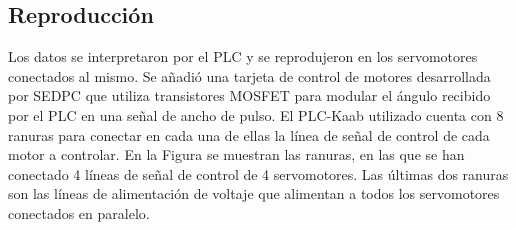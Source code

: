\subsection{Reproducción}

Los datos se interpretaron por el PLC y se reprodujeron en los servomotores conectados al mismo. Se añadió una tarjeta de control de motores desarrollada por SEDPC que utiliza transistores MOSFET para modular el ángulo recibido por el PLC en una señal de ancho de pulso. El PLC-Kaab utilizado cuenta con 8 ranuras para conectar en cada una de ellas la línea de señal de control de cada motor a controlar. En la Figura se muestran las ranuras, en las que se han conectado 4 líneas de señal de control de 4 servomotores. Las últimas dos ranuras son las líneas de alimentación de voltaje que alimentan a todos los servomotores conectados en paralelo.